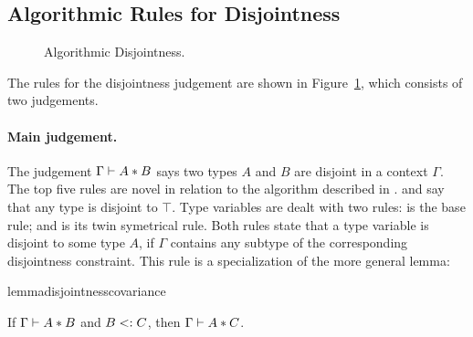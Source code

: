 \subsection{Algorithmic Rules for Disjointness}

\begin{figure}[!t]


  \caption{Algorithmic Disjointness.}
  \label{fig:disjointness}
\end{figure}

The rules for the disjointness judgement are shown in
Figure~\ref{fig:disjointness}, which consists of two judgements.
 
\paragraph{Main judgement.} The judgement $\Gamma \vdash A * B$ says
two types $A$ and $B$ are disjoint in a context $\Gamma$.
The top five rules are novel in relation to the algorithm described in \oldname.
 and  say that any type is disjoint to 
$\top$. Type variables are dealt with two rules:
 is the base rule; and 
is its twin symetrical rule. 
Both rules state that a type variable is disjoint to some type $A$, if $\Gamma$ contains any
subtype of the corresponding disjointness constraint. 
This rule is a specialization of the more general lemma:

\begin{restatable}{lemma}{disjointnesscovariance}
  \label{lemma:disjointness-covariance}

  If $\Gamma \vdash A * B$ and $B <: C$, then $\Gamma \vdash A * C$.
\end{restatable}


